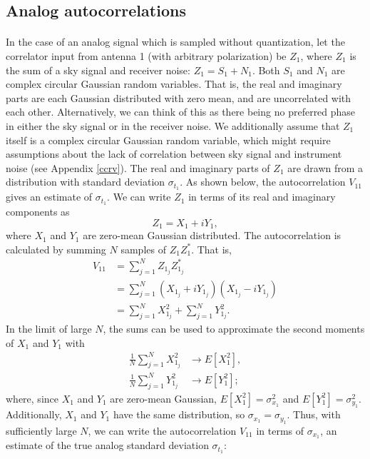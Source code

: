 \documentclass[11pt]{article}
\begin{document}
\subsection{Analog autocorrelations}\label{autos1}
\paragraph{}
In the case of an analog signal which is sampled without quantization, let the correlator input from antenna 1 (with arbitrary polarization) be $Z_1$, where $Z_1$ is the sum of a sky signal and receiver noise: $Z_1=S_1+ N_1$. Both $S_1$ and $N_1$ are complex circular Gaussian random variables. That is, the real and imaginary parts are each Gaussian distributed with zero mean, and are uncorrelated with each other. Alternatively, we can think of this as there being no preferred phase in either the sky signal or in the receiver noise. We additionally assume that $Z_1$ itself is a complex circular Gaussian random variable, which might require assumptions about the lack of correlation between sky signal and instrument noise (see Appendix \ref{ccrv}). The real and imaginary parts of $Z_1$ are drawn from a distribution with standard deviation $\sigma_{t_1}$. As shown below, the autocorrelation $V_{11}$ gives an estimate of $\sigma_{t_1}$. We can write $Z_1$ in terms of its real and imaginary components as 
\begin{equation}
Z_1=X_1+iY_1,
\end{equation}
where $X_1$ and $Y_1$ are zero-mean Gaussian distributed. The autocorrelation is calculated by summing $N$ samples of $Z_1Z_1^*$. That is,
\begin{align}
V_{11} &= \sum_{j=1}^N Z_{1_j}Z_{1_j}^*\\
&= \sum_{j=1}^N (X_{1_j} + iY_{1_j})(X_{1_j}-iY_{1_j})\\
&= \sum_{j=1}^N X_{1_j}^2 + \sum_{j=1}^N Y_{1_j}^2.
\end{align}
In the limit of large $N$, the sums can be used to approximate the second moments of $X_1$ and $Y_1$ with
\begin{align}
\frac{1}{N}\sum_{j=1}^N X_{1_j}^2 &\rightarrow E[X_1^2],\\
\frac{1}{N}\sum_{j=1}^N Y_{1_j}^2 &\rightarrow E[Y_1^2];
\end{align}
where, since $X_1$ and $Y_1$ are zero-mean Gaussian, $E[X_1^2] =\sigma_{x_1}^2$ and $E[Y_1^2]=\sigma_{y_1}^2$. Additionally, $X_1$ and $Y_1$ have the same distribution, so $\sigma_{x_1}=\sigma_{y_1}$. Thus, with sufficiently large $N$, we can write the autocorrelation $V_{11}$ in terms of $\sigma_{x_1}$, an estimate of the true analog standard deviation $\sigma_{t_1}$:
\end{document}
